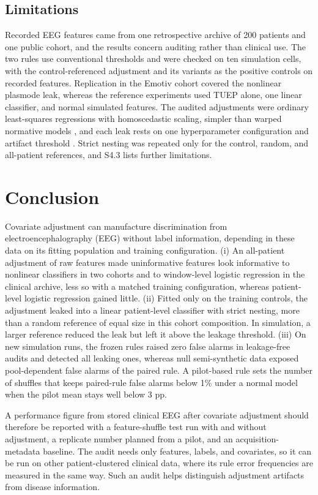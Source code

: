 \documentclass[final,1p,times]{elsarticle}
\begin{document}
\subsection{Limitations}\label{sec:batasan}

Recorded EEG features came from one retrospective archive of 200 patients and one public cohort, and the results concern auditing rather than clinical use. The two rules use conventional thresholds and were checked on ten simulation cells, with the control-referenced adjustment and its variants as the positive controls on recorded features. Replication in the Emotiv cohort covered the nonlinear plasmode leak, whereas the reference experiments used TUEP alone, one linear classifier, and normal simulated features. The audited adjustments were ordinary least-squares regressions with homoscedastic scaling, simpler than warped normative models \cite{fraza2021}, and each leak rests on one hyperparameter configuration and artifact threshold \cite{kessler2025}. Strict nesting was repeated only for the control, random, and all-patient references, and S4.3 lists further limitations.%
\section{Conclusion}\label{sec:conclusion}
Covariate adjustment can manufacture discrimination from electroencephalography (EEG) without label information, depending in these data on its fitting population and training configuration. (i) An all-patient adjustment of raw features made uninformative features look informative to nonlinear classifiers in two cohorts and to window-level logistic regression in the clinical archive, less so with a matched training configuration, whereas patient-level logistic regression gained little. (ii) Fitted only on the training controls, the adjustment leaked into a linear patient-level classifier with strict nesting, more than a random reference of equal size in this cohort composition. In simulation, a larger reference reduced the leak but left it above the leakage threshold. (iii) On new simulation runs, the frozen rules raised zero false alarms in leakage-free audits and detected all leaking ones, whereas null semi-synthetic data exposed pool-dependent false alarms of the paired rule. A pilot-based rule sets the number of shuffles that keeps paired-rule false alarms below 1\% under a normal model when the pilot mean stays well below 3 pp.

A performance figure from stored clinical EEG after covariate adjustment should therefore be reported with a feature-shuffle test run with and without adjustment, a replicate number planned from a pilot, and an acquisition-metadata baseline. The audit needs only features, labels, and covariates, so it can be run on other patient-clustered clinical data, where its rule error frequencies are measured in the same way. Such an audit helps distinguish adjustment artifacts from disease information.%
\end{document}
